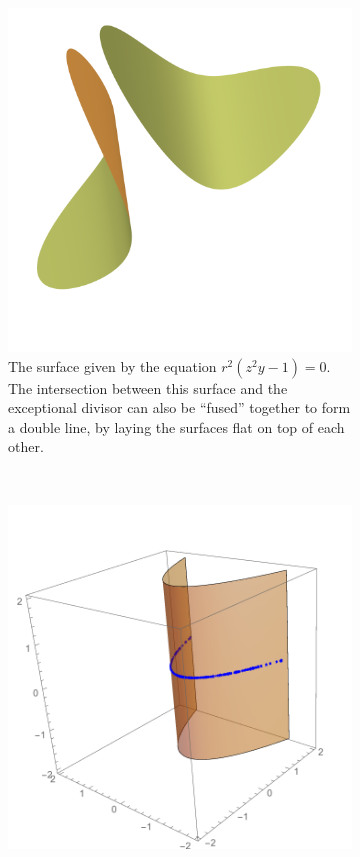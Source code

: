 \documentclass{article}
\begin{document}
\begin{example}
\begin{figure}[h!]
\begin{subfigure}[t]{0.3\textwidth}
                \includegraphics[width=\textwidth]{pictures/line_blowup_affine_2.png} 
                \caption{The surface given by the equation $r^2(z^2y - 1) = 0$. The
                    intersection between this surface and the exceptional divisor can
                    also be ``fused'' together to form a double line, by laying the
                surfaces flat on top of each other.}
            \end{subfigure}
            \\
            \begin{subfigure}[t]{0.3\textwidth}
                \includegraphics[width=\textwidth]{pictures/affine_1_exceptional.pdf} 

\end{subfigure}
\end{figure}
\end{example}
\end{document}
